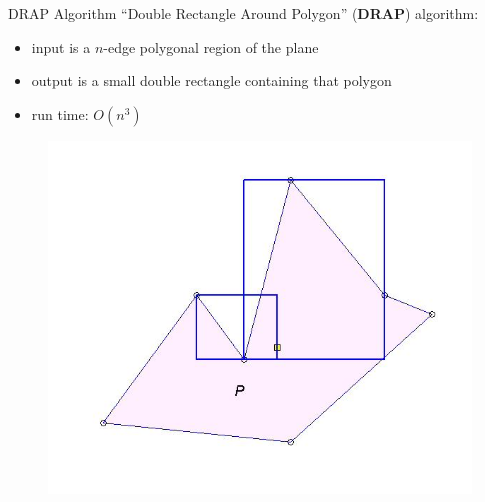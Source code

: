 \documentclass[10pt]{beamer}
\begin{document}
\begin{frame}{DRAP Algorithm}
  ``Double Rectangle Around Polygon'' (\textbf{DRAP}) algorithm:\\
  \begin{itemize}
  \item input is a $n$-edge polygonal region of the plane
  \item output is a small double rectangle containing that polygon
  \item run time: $O(n^3)$
  \end{itemize}
  \begin{figure}
    \includegraphics[scale=0.3]{figs/drap3.jpg}
  \end{figure}
\end{frame}
\end{document}
